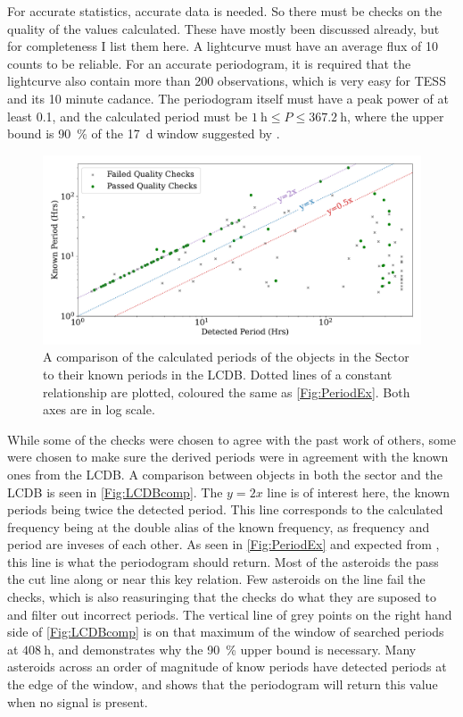 \documentclass{UCreport}
\begin{document}
For accurate statistics, accurate data is needed. 
So there must be checks on the quality of the values calculated. 
These have mostly been discussed already, but for completeness I list them here.
A lightcurve must have an average flux of 10 counts to be reliable.
For an accurate periodogram, it is required that the lightcurve also contain more than 200 observations, which is very easy for TESS and its 10 minute cadance.
The periodogram itself must have a peak power of at least 0.1, and the calculated period must be $\qty{1}{\hour}\leq P \leq \qty{367.2}{\hour}$, where the upper bound is \qty{90}{\percent} of the \qty{17}{\day} window suggested by \cite{McNeill2023}.  
\begin{figure}[t]
  \centering
  \includegraphics[width=\textwidth]{../OzData/LCBDcompLogScaleLineText1.pdf}
  \caption[Known against calculated period]{A comparison of the calculated periods of the objects in the Sector to their known periods in the LCDB. 
  Dotted lines of a constant relationship are plotted, coloured the same as \autoref{Fig:PeriodEx}.
  Both axes are in log scale.
  }

  \label{Fig:LCDBcomp}
\end{figure}
While some of the checks were chosen to agree with the past work of others, some were chosen to make sure the derived periods were in agreement with the known ones from the LCDB.
A comparison between objects in both the sector and the LCDB is seen in \autoref{Fig:LCDBcomp}. 
The $y=2x$ line is of interest here, the known periods being twice the detected period. 
This line corresponds to the calculated frequency being at the double alias of the known frequency, as frequency and period are inveses of each other. 
As seen in \autoref{Fig:PeriodEx} and expected from \citet{McNeill2023}, this line is what the periodogram should return. 
Most of the asteroids the pass the cut line along or near this key relation. 
Few asteroids on the line fail the checks, which is also reasuringing that the checks do what they are suposed to and filter out incorrect periods.
The vertical line of grey points on the right hand side of \autoref{Fig:LCDBcomp} is on that maximum of the window of searched periods at $\qty{408}{\hour}$, and demonstrates why the \qty{90}{\percent} upper bound is necessary.
Many asteroids across an order of magnitude of know periods have detected periods at the edge of the window, and shows that the periodogram will return this value when no signal is present.  
\end{document}
